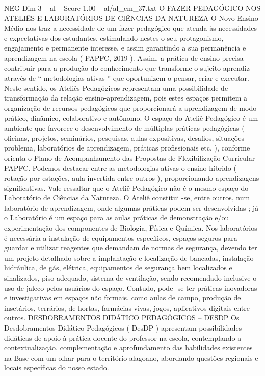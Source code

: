 \begin{textsample}{NEG Dim 3 – al – Score 1.00 – al/al\_em\_37.txt}  \label{ex:f3_neg_075}
O FAZER PEDAGÓGICO NOS ATELIÊS E LABORATÓRIOS DE CIÊNCIAS DA NATUREZA O Novo Ensino Médio nos traz a necessidade de um fazer pedagógico que atenda às necessidades e expectativas dos estudantes, estimulando nestes o seu protagonismo, engajamento e permanente interesse, e assim garantindo a sua permanência e aprendizagem na escola ( PAPFC, 2019 ).
Assim, a prática de ensino precisa contribuir para a produção do conhecimento que transforme o sujeito aprendiz através de “ metodologias ativas ” que oportunizem o pensar, criar e executar.
Neste sentido, os Ateliês Pedagógicos representam uma possibilidade de transformação da relação ensino-aprendizagem, pois estes espaços permitem a organização de recursos pedagógicos que proporcionará a aprendizagem de modo prático, dinâmico, colaborativo e autônomo.
O espaço do Ateliê Pedagógico é um ambiente que favorece o desenvolvimento de múltiplas práticas pedagógicas ( oficinas, projetos, seminários, pesquisas, aulas expositivas, desafios, situações-problema, laboratórios de aprendizagem, práticas profissionais etc. ), conforme orienta o Plano de Acompanhamento das Propostas de Flexibilização Curricular – PAPFC.
Podemos destacar entre as metodologias ativas o ensino híbrido ( rotação por estações, aula invertida entre outros ), proporcionando aprendizagens significativas.
Vale ressaltar que o Ateliê Pedagógico não é o mesmo espaço do Laboratório de Ciências da Natureza.
O Ateliê constitui -se, entre outros, num laboratório de aprendizagem, onde algumas práticas podem ser desenvolvidas ; já o Laboratório é um espaço para as aulas práticas de demonstração e/ou experimentação dos componentes de Biologia, Física e Química.
Nos laboratórios é necessária a instalação de equipamentos específicos, espaços seguros para guardar e utilizar reagentes que demandam de normas de segurança, devendo ter um projeto detalhado sobre a implantação e localização de bancadas, instalação hidráulica, de gás, elétrica, equipamentos de segurança bem localizados e sinalizados, piso adequado, sistema de ventilação, sendo recomendado inclusive o uso de jaleco pelos usuários do espaço.
Contudo, pode -se ter práticas inovadoras e investigativas em espaços não formais, como aulas de campo, produção de insetários, terrários, de hortas, farmácias vivas, jogos, aplicativos digitais entre outros.
DESDOBRAMENTOS DIDÁTICO PEDAGÓGICOS – DESDP Os Desdobramentos Didático Pedagógicos ( DesDP ) apresentam possibilidades didáticas de apoio à prática docente do professor na escola, contemplando a contextualização, complementação e aprofundamento das habilidades existentes na Base com um olhar para o território alagoano, abordando questões regionais e locais específicas do nosso estado.

\end{textsample}
